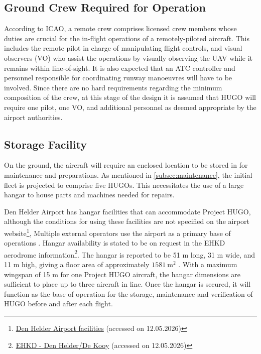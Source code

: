 \subsection{Ground Crew Required for Operation}
\label{subsec:ground_crew}
According to ICAO\cite{ICAO2011UAS}, a remote crew comprises licensed crew members whose duties are crucial for the in-flight operations of a remotely-piloted
aircraft. This includes the remote pilot in charge of manipulating flight controls, and visual observers (VO) who assist the operations by visually observing the UAV while it remains within line-of-sight. It is also expected that an ATC controller and personnel responsible for coordinating runway manoeuvres will have to be involved. Since there are no hard requirements regarding the minimum composition of the crew, at this stage of the design it is assumed that HUGO will require one pilot, one VO, and additional personnel as deemed appropriate by the airport authorities.

\subsection{Storage Facility}
\label{subsec:hangar}
On the ground, the aircraft will require an enclosed location to be stored in for maintenance and preparations. As mentioned in \autoref{subsec:maintenance}, the initial fleet is projected to comprise five HUGOs. This necessitates the use of a large hangar to house parts and machines needed for repairs. 

Den Helder Airport has hangar facilities that can accommodate Project HUGO, although the conditions for using these facilities are not specified on the airport website\footnote{\label{fn:denhelder_facilities}\href{https://denhelderairport.nl/eng/airport/#faciliteiten}{Den Helder Airport facilities} (accessed on 12.05.2026)}, Multiple external operators use the airport as a primary base of operations . Hangar availability is stated to be on request in the EHKD aerodrome information\footnote{\label{fn:ehkd_eaip}\href{https://eaip.lvnl.nl/web/eaip/AIRAC\%20AMDT\%2005-2026_2026_05_14/eAIP/EH-AD\%202\%20EHKD\%201-en-GB.html}{EHKD - Den Helder/De Kooy} (accessed on 12.05.2026)}. The hangar is reported to be 51 m long, 31 m wide, and 11 m high, giving a floor area of approximately \(1581~\mathrm{m^2}\) \cite{DenHelderAirport2013DHANieuwsbrief}. With a maximum wingspan of 15 m for one Project HUGO aircraft, the hangar dimensions are sufficient to place up to three aircraft in line. Once the hangar is secured, it will function as the base of operation for the storage, maintenance and verification of HUGO before and after each flight. 

